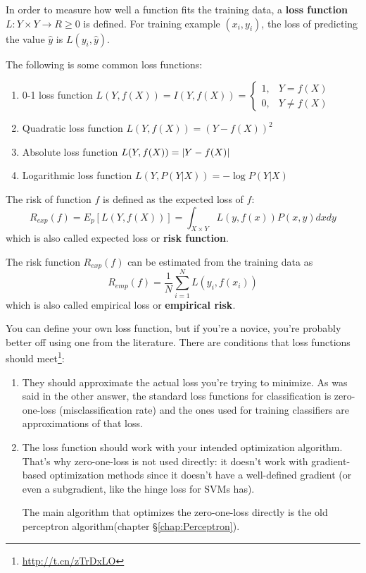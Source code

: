 \begin{definition}
In order to measure how well a function fits the training data, a \textbf{loss function} $L:Y \times Y \rightarrow R \geq 0$ is defined. For training example $(x_i,y_i)$, the loss of predicting the value $\widehat{y}$ is $L(y_i,\widehat{y})$.
\end{definition}

The following is some common loss functions:
\begin{enumerate}
\item 0-1 loss function $L(Y,f(X))=I(Y,f(X))=\begin{cases} 1, & Y=f(X) \\ 0, & Y \neq f(X) \end{cases}$
\item Quadratic loss function $L(Y,f(X))=\left(Y-f(X)\right)^2$
\item Absolute loss function $L(Y,f(X))=\left\lvert Y-f(X)\right\rvert$
\item Logarithmic loss function $L(Y,P(Y|X))=-\log{P(Y|X)}$
\end{enumerate}

\begin{definition}
The risk of function $f$ is defined as the expected loss of $f$:
\begin{equation}
R_{exp}(f)=E_p\left[L\left(Y,f(X)\right)\right]=\int _{X \times Y} L\left(y,f(x)\right)P(x,y)dxdy
\end{equation}
which is also called expected loss or \textbf{risk function}.
\end{definition}

\begin{definition}
The risk function $R_{exp}(f)$ can be estimated from the training data as
\begin{equation}
R_{emp}(f)=\dfrac{1}{N}\sum\limits_{i=1}^{N} L\left(y_i,f(x_i)\right)
\end{equation}
which is also called empirical loss or \textbf{empirical risk}.
\end{definition}

You can define your own loss function, but if you're a novice, you're probably better off using one from the literature. There are conditions that loss functions should meet\footnote{\url{http://t.cn/zTrDxLO}}:
\begin{enumerate}
\item They should approximate the actual loss you're trying to minimize. As was said in the other answer, the standard loss functions for classification is zero-one-loss (misclassification rate) and the ones used for training classifiers are approximations of that loss.
\item The loss function should work with your intended optimization algorithm. That's why zero-one-loss is not used directly: it doesn't work with gradient-based optimization methods since it doesn't have a well-defined gradient (or even a subgradient, like the hinge loss for SVMs has).

The main algorithm that optimizes the zero-one-loss directly is the old perceptron algorithm(chapter \S \ref{chap:Perceptron}).
\end{enumerate}

